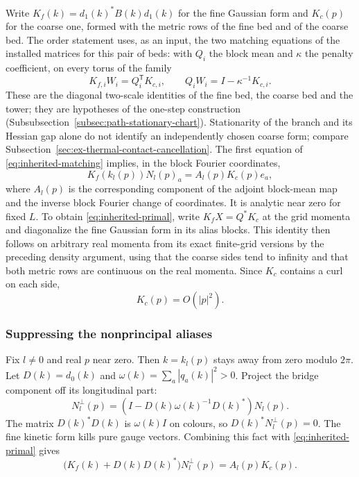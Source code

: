 Write $K_f(k)=d_1(k)^*B(k)d_1(k)$ for the fine Gaussian form and
$K_c(p)$ for the coarse one, formed with the metric rows of the fine
bed and of the coarse bed. The order statement uses, as an input, the
two matching equations of the installed matrices for this pair of
beds: with $Q_i$ the block mean and $\kappa$ the penalty coefficient,
on every torus of the family
\begin{equation}\label{eq:inherited-matching}
 K_{f,i}W_i=Q_i^{\mathsf T}K_{c,i},\qquad
 Q_iW_i=I-\kappa^{-1}K_{c,i}.
\end{equation}
These are the diagonal two-scale identities of the fine bed, the
coarse bed and the tower; they are hypotheses of the one-step
construction (Subsubsection~\ref{subsec:path-stationary-chart}).
Stationarity of the branch and its Hessian gap alone do not identify
an independently chosen coarse form; compare
Subsection~\ref{sec:ex-thermal-contact-cancellation}. The first equation
of \eqref{eq:inherited-matching}
implies, in the block Fourier coordinates,
\begin{equation}\label{eq:inherited-primal}
          K_f(k_l(p))N_l(p)_a=A_l(p)K_c(p)e_a,
\end{equation}
where $A_l(p)$ is the corresponding component of the adjoint
block-mean map and the inverse block Fourier change of coordinates.
It is analytic near zero for fixed $L$. To obtain
\eqref{eq:inherited-primal}, write $K_fX=Q^*K_c$ at the grid momenta
and diagonalize the fine Gaussian form
in its alias blocks. This identity then follows on arbitrary real
momenta from its exact finite-grid versions by the preceding
density argument, using that the coarse sides tend to infinity and
that both metric rows are continuous on the real momenta. Since $K_c$ contains a curl on each side,
\[
                             K_c(p)=O(|p|^2).
\]

\subsubsection{Suppressing the nonprincipal aliases}
Fix $l\ne0$ and real $p$ near zero. Then $k=k_l(p)$ stays away
from zero modulo $2\pi$. Let $D(k)=d_0(k)$ and
$\omega(k)=\sum_a|q_a(k)|^2>0$. Project the bridge component
off its longitudinal part:
\[
 N_l^{\perp}(p)
    =\left(I-D(k)\omega(k)^{-1}D(k)^*\right)N_l(p).
\]
The matrix $D(k)^*D(k)$ is $\omega(k)I$ on colours, so
$D(k)^*N_l^{\perp}(p)=0$. The fine kinetic form kills pure
gauge vectors. Combining this fact with
\eqref{eq:inherited-primal} gives
\begin{equation}\label{eq:inherited-elliptic-alias}
     \bigl(K_f(k)+D(k)D(k)^*\bigr)N_l^{\perp}(p)
                           =A_l(p)K_c(p).
\end{equation}

